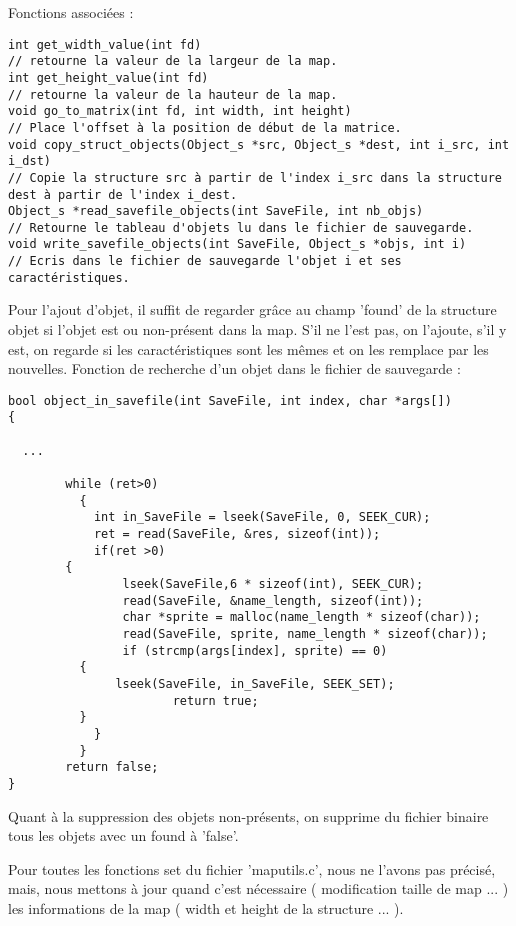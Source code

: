 \documentclass[a4paper]{article}
\begin{document}
Fonctions associées :
\begin{verbatim}
int get_width_value(int fd)
// retourne la valeur de la largeur de la map.
int get_height_value(int fd)
// retourne la valeur de la hauteur de la map.
void go_to_matrix(int fd, int width, int height)
// Place l'offset à la position de début de la matrice.
void copy_struct_objects(Object_s *src, Object_s *dest, int i_src, int i_dst)
// Copie la structure src à partir de l'index i_src dans la structure dest à partir de l'index i_dest.
Object_s *read_savefile_objects(int SaveFile, int nb_objs)
// Retourne le tableau d'objets lu dans le fichier de sauvegarde.
void write_savefile_objects(int SaveFile, Object_s *objs, int i)
// Ecris dans le fichier de sauvegarde l'objet i et ses caractéristiques.
\end{verbatim}

Pour l'ajout d'objet, il suffit de regarder grâce au champ 'found' de la structure objet si l'objet est ou non-présent dans la map. S'il ne l'est pas, on l'ajoute, s'il y est, on regarde si les caractéristiques sont les mêmes et on les remplace par les nouvelles.
Fonction de recherche d'un objet dans le fichier de sauvegarde :

\begin{verbatim}
bool object_in_savefile(int SaveFile, int index, char *args[])
{

  ...
  
        while (ret>0)
          {
            int in_SaveFile = lseek(SaveFile, 0, SEEK_CUR);
            ret = read(SaveFile, &res, sizeof(int));
            if(ret >0)
	    {
                lseek(SaveFile,6 * sizeof(int), SEEK_CUR);
                read(SaveFile, &name_length, sizeof(int));
                char *sprite = malloc(name_length * sizeof(char));
                read(SaveFile, sprite, name_length * sizeof(char));
                if (strcmp(args[index], sprite) == 0)
		  {
		       lseek(SaveFile, in_SaveFile, SEEK_SET);
                       return true;
		  }
            }
          }
        return false;
}
\end{verbatim}

Quant à la suppression des objets non-présents, on supprime du fichier binaire tous les objets avec un found à 'false'.

Pour toutes les fonctions set du fichier 'maputils.c', nous ne l'avons pas précisé, mais, nous mettons à jour quand c'est nécessaire ( modification taille de map ... ) les informations de la map ( width et height de la structure ... ).
\end{document}
